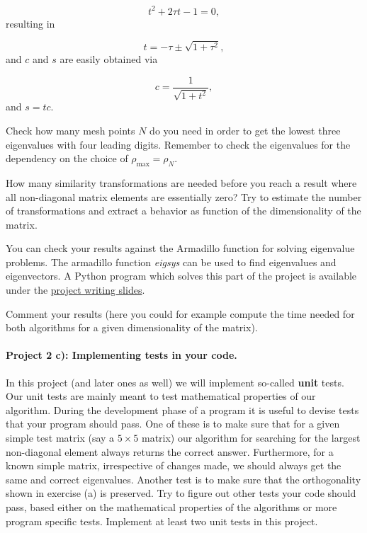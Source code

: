 \documentclass[%
oneside,                 %
final,                   %
10pt]{article}
\begin{document}
\begin{equation*}
t^2+2\tau t-1= 0,
\end{equation*}
resulting in

\begin{equation*}
  t = -\tau \pm \sqrt{1+\tau^2},
\end{equation*}
and $c$ and $s$ are easily obtained via

\begin{equation*}
   c = \frac{1}{\sqrt{1+t^2}},
\end{equation*}
and $s=tc$.  

Check how many mesh points $N$
do you need in order to get the lowest three eigenvalues 
with four leading digits.
Remember to check the eigenvalues for 
the dependency on the choice of $\rho_{\mathrm{max}}=\rho_N$.

How many similarity transformations are needed before you reach a 
result where all non-diagonal matrix elements are essentially zero?
Try to estimate the number of transformations and extract a behavior as function
of the dimensionality of the matrix.

You can check your results against the Armadillo function for solving 
eigenvalue problems. The armadillo function \emph{eigsys} can be used to find eigenvalues and eigenvectors.
A Python program which solves this part of the project is available under the \href{{http://compphysics.github.io/ComputationalPhysics/doc/pub/projectwriting/html/projectwriting.html}}{project writing slides}. 



Comment your results (here you could for example compute the time needed for 
both algorithms for a given dimensionality of the matrix).  


\paragraph{Project 2 c): Implementing tests in your code.}
In this project (and later ones as well) we will implement so-called \textbf{unit} tests. Our unit tests are mainly meant to test mathematical properties of our algorithm. During the development phase of a program it is useful to devise tests that your program should pass. One of these is to make sure that for a given simple test matrix (say a $5\times 5$ matrix) our algorithm for searching for the largest non-diagonal element always returns the correct answer. Furthermore, for a known simple matrix, irrespective of changes made, we should always get the same and correct eigenvalues. Another test is to make sure that the orthogonality shown in exercise (a) is preserved. Try to figure out other tests your code should pass, based either on the mathematical properties of the algorithms or more program specific tests. Implement at least two unit tests in this project. 
\end{document}

